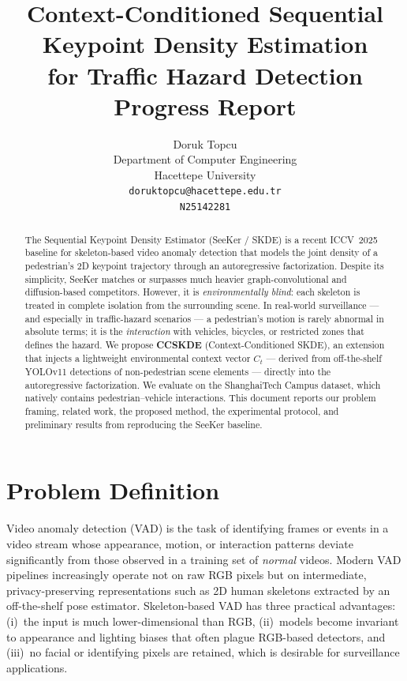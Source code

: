 \documentclass{article}
\title{Context-Conditioned Sequential Keypoint Density Estimation\\
       for Traffic Hazard Detection \\ \vspace{0.4em}
       {\large Progress Report}}
\author{Doruk Topcu \\
        Department of Computer Engineering \\
        Hacettepe University \\
        \texttt{doruktopcu@hacettepe.edu.tr} \\
        \texttt{N25142281}}
\begin{document}
\maketitle

\begin{abstract}
The Sequential Keypoint Density Estimator (SeeKer / SKDE) is a recent
ICCV~2025 baseline for skeleton-based video anomaly detection that models the
joint density of a pedestrian's 2D keypoint trajectory through an autoregressive
factorization. Despite its simplicity, SeeKer matches or surpasses much heavier
graph-convolutional and diffusion-based competitors. However, it is
\emph{environmentally blind}: each skeleton is treated in complete isolation
from the surrounding scene. In real-world surveillance --- and especially in
traffic-hazard scenarios --- a pedestrian's motion is rarely abnormal in
absolute terms; it is the \emph{interaction} with vehicles, bicycles, or
restricted zones that defines the hazard. We propose
\textbf{CCSKDE} (Context-Conditioned SKDE), an extension that injects a
lightweight environmental context vector $C_t$ --- derived from off-the-shelf
YOLOv11 detections of non-pedestrian scene elements --- directly into the
autoregressive factorization. We evaluate on the ShanghaiTech Campus dataset,
which natively contains pedestrian--vehicle interactions. This document
reports our problem framing, related work, the proposed method, the
experimental protocol, and preliminary results from reproducing the
SeeKer baseline.
\end{abstract}

\section{Problem Definition}
\label{sec:problem}

Video anomaly detection (VAD) is the task of identifying frames or events in a
video stream whose appearance, motion, or interaction patterns deviate
significantly from those observed in a training set of \emph{normal} videos.
Modern VAD pipelines increasingly operate not on raw RGB pixels but on
intermediate, privacy-preserving representations such as 2D human skeletons
extracted by an off-the-shelf pose estimator. Skeleton-based VAD has three
practical advantages: (i)~the input is much lower-dimensional than RGB,
(ii)~models become invariant to appearance and lighting biases that often
plague RGB-based detectors, and (iii)~no facial or identifying pixels are
retained, which is desirable for surveillance applications.
\end{document}
